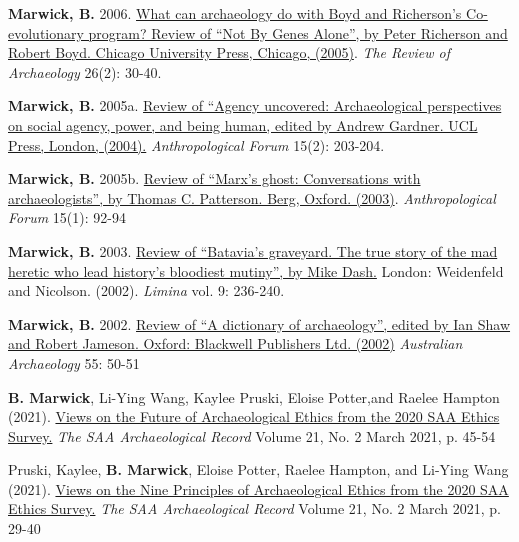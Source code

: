 \documentclass[11pt,article,oneside]{memoir}
\begin{document}
{{{\ind \textbf{Marwick, B.} 2006. \href{http://faculty.washington.edu/bmarwick/PDFs/Marwick_2006_[B&R].pdf}{What can archaeology do with Boyd and Richerson’s Co-evolutionary program? Review of “Not By Genes Alone”, by Peter Richerson and Robert Boyd. Chicago University Press, Chicago, (2005)}. \textit{The Review of Archaeology} 26(2): 30-40.

\ind \textbf{Marwick, B.} 2005a. \href{http://faculty.washington.edu/bmarwick/PDFs/Uncovered.pdf}{Review of “Agency uncovered: Archaeological perspectives on social agency, power, and being human, edited by Andrew Gardner. UCL Press, London, (2004).} \textit{Anthropological Forum} 15(2): 203-204.

\ind \textbf{Marwick, B.} 2005b. \href{http://faculty.washington.edu/bmarwick/PDFs/Ghosts.pdf}{Review of “Marx’s ghost: Conversations with archaeologists”, by Thomas C. Patterson. Berg, Oxford. (2003)}. \textit{Anthropological Forum} 15(1): 92-94

\ind \textbf{Marwick, B.} 2003. \href{http://faculty.washington.edu/bmarwick/PDFs/Batavia.pdf}{Review of “Batavia’s graveyard. The true story of the mad heretic who lead history’s bloodiest mutiny”, by Mike Dash.} London: Weidenfeld and Nicolson. (2002). \textit{Limina} vol. 9: 236-240.

\ind \textbf{Marwick, B.} 2002. \href{http://faculty.washington.edu/bmarwick/PDFs/Marwick_2002_Dictionary.pdf}{Review of “A dictionary of archaeology”, edited by Ian Shaw and Robert Jameson. Oxford: Blackwell Publishers Ltd. (2002)} \textit{Australian Archaeology} 55: 50-51

\bigskip

\newpage


\ind \textbf{B. Marwick}, Li-Ying Wang, Kaylee Pruski, Eloise Potter,and Raelee Hampton (2021). \href{http://onlinedigeditions.com/publication/?m=16146&i=700116&p=46&ver=html5}{Views on the Future of Archaeological Ethics from the 2020 SAA Ethics Survey.} \textit{The SAA Archaeological Record} Volume 21, No. 2 March 2021, p. 45-54 

\ind Pruski, Kaylee, \textbf{B. Marwick}, Eloise Potter, Raelee Hampton, and Li-Ying Wang (2021). \href{http://onlinedigeditions.com/publication/?m=16146&i=700116&p=30&ver=html5}{Views on the Nine Principles of Archaeological Ethics from the 2020 SAA Ethics Survey.} \textit{The SAA Archaeological Record} Volume 21, No. 2 March 2021, p. 29-40 

}}}
\end{document}
